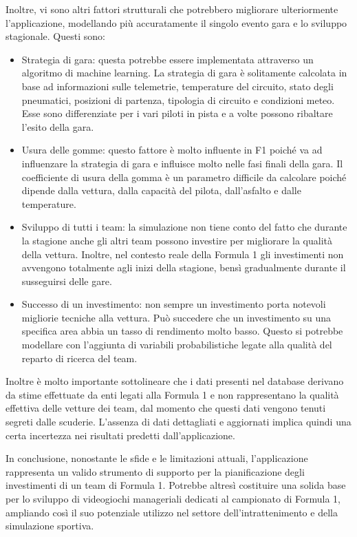 Inoltre, vi sono altri fattori strutturali che potrebbero migliorare ulteriormente l'applicazione, modellando più accuratamente il singolo evento gara e lo sviluppo stagionale. Questi sono:
\begin{itemize}[label=-]
    \item Strategia di gara: questa potrebbe essere implementata attraverso un algoritmo di machine learning. La strategia di gara è solitamente calcolata in base ad informazioni sulle telemetrie, temperature del circuito, stato degli pneumatici, posizioni di partenza, tipologia di circuito e condizioni meteo. Esse sono differenziate per i vari piloti in pista e a volte possono ribaltare l’esito della gara.
    \item Usura delle gomme: questo fattore è molto influente in F1 poiché va ad influenzare la strategia di gara e influisce molto nelle fasi finali della gara. Il coefficiente di usura della gomma è un parametro difficile da calcolare poiché dipende dalla vettura, dalla capacità del pilota, dall’asfalto e dalle temperature.
    \item Sviluppo di tutti i team: la simulazione non tiene conto del fatto che durante la stagione anche gli altri team possono investire per migliorare la qualità della vettura. Inoltre, nel contesto reale della Formula 1 gli investimenti non avvengono totalmente agli inizi della stagione, bensì gradualmente durante il susseguirsi delle gare.
    \item Successo di un investimento: non sempre un investimento porta notevoli migliorie tecniche alla vettura. Può succedere che un investimento su una specifica area abbia un tasso di rendimento molto basso. Questo si potrebbe modellare con l’aggiunta di variabili probabilistiche legate alla qualità del reparto di ricerca del team.
\end{itemize}

Inoltre è molto importante sottolineare che i dati presenti nel database derivano da stime effettuate da enti legati alla Formula 1 e non rappresentano la qualità effettiva delle vetture dei team, dal momento che questi dati vengono tenuti segreti dalle scuderie. L'assenza di dati dettagliati e aggiornati implica quindi una certa incertezza nei risultati predetti dall'applicazione.

In conclusione, nonostante le sfide e le limitazioni attuali, l'applicazione rappresenta un valido strumento di supporto per la pianificazione degli investimenti di un team di Formula 1. Potrebbe altresì costituire una solida base per lo sviluppo di videogiochi manageriali dedicati al campionato di Formula 1, ampliando così il suo potenziale utilizzo nel settore dell'intrattenimento e della simulazione sportiva.


